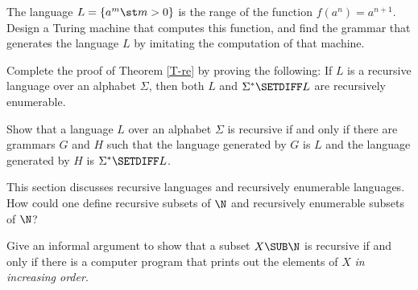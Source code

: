\begin{exercises}

\problem The language $L=\{a^m\st m>0\}$ is the range of the function
$f(a^n)=a^{n+1}$.  Design a Turing machine that computes this function,
and find the grammar that generates the language $L$ by
imitating the computation of that machine.

\problem Complete the proof of Theorem \ref{T-re} by proving
the following:  If $L$ is a recursive language over an
alphabet $\Sigma$, then both
$L$ and $\Sigma^*\SETDIFF L$ are recursively enumerable.

\problem Show that a language $L$ over an alphabet $\Sigma$
is recursive if and only if there are grammars $G$
and $H$ such that the language generated by $G$ is $L$ and the
language generated by $H$ is $\Sigma^*\SETDIFF L$.

\problem This section discusses recursive languages and recursively
enumerable languages.  How could one define recursive subsets of
$\N$ and recursively enumerable subsets of $\N$?

\problem Give an informal argument to show that a subset $X\SUB\N$ is
recursive if and only if there is a computer program
that prints out the elements of $X$ {\it in increasing order}.

\end{exercises}

